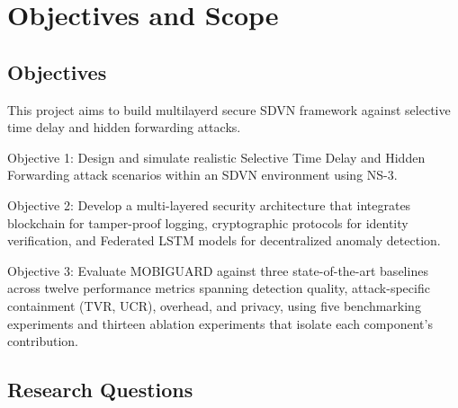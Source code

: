 \documentclass[12pt, a4paper]{report}
\begin{document}
\section{Objectives and Scope}

\subsection{Objectives}

This project aims to build multilayerd secure SDVN framework against selective time delay and hidden forwarding attacks.

Objective 1: Design and simulate realistic Selective Time Delay and Hidden Forwarding attack scenarios within an SDVN environment using NS-3.


Objective 2: Develop a multi-layered security architecture that integrates blockchain for tamper-proof logging, cryptographic protocols for identity verification, and Federated LSTM models for decentralized anomaly detection.


Objective 3: Evaluate MOBIGUARD against three
state-of-the-art baselines across twelve performance
metrics spanning detection quality, attack-specific
containment (TVR, UCR), overhead, and privacy, using
five benchmarking experiments and thirteen ablation
experiments that isolate each component's contribution.



\subsection{Research Questions}
\label{sec:rqs}
\end{document}
